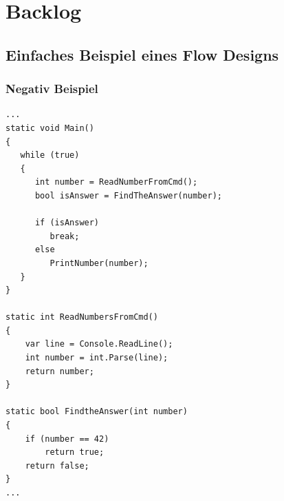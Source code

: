 \documentclass[11pt]{article}
\begin{document}
\section{Backlog}
\label{sec:orgheadline55}
\subsection{Einfaches Beispiel eines Flow Designs}
\label{sec:orgheadline54}
\subsubsection{Negativ Beispiel}
\label{sec:orgheadline53}
\begin{verbatim}
...
static void Main()
{
   while (true)
   {
      int number = ReadNumberFromCmd();
      bool isAnswer = FindTheAnswer(number);

      if (isAnswer)
         break;
      else
         PrintNumber(number);
   }
}

static int ReadNumbersFromCmd()
{
    var line = Console.ReadLine();
    int number = int.Parse(line);
    return number;
}

static bool FindtheAnswer(int number)
{ 
    if (number == 42)
        return true;
    return false;
}
...
\end{verbatim}
\end{document}
